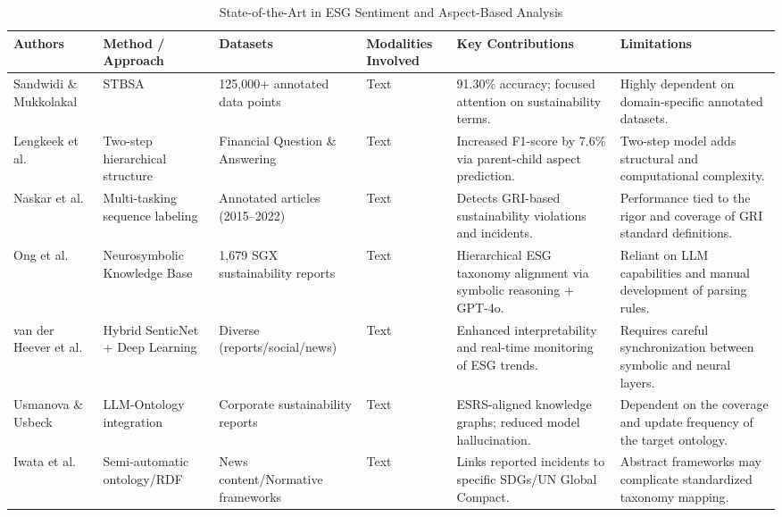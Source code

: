 \begin{landscape}
\begin{table}[p]
\centering
\caption{State-of-the-Art in ESG Sentiment and Aspect-Based Analysis}
\label{tab:esg-sentiment-aspect-analysis}
\small
\renewcommand{\arraystretch}{1.2}
\begin{tabularx}{\linewidth}{|p{1.8cm}|p{3cm}|p{3cm}|p{1.8cm}|X|X|}
\hline
Authors & Method / Approach & Datasets & Modalities Involved & Key Contributions & Limitations \\ \hline
Sandwidi \& Mukkolakal  \parencite{blaise_sandwidi_c58b16e0} & STBSA & 125,000+ annotated data points & Text & 91.30\% accuracy; focused attention on sustainability terms. & Highly dependent on domain-specific annotated datasets. \\ \hline
Lengkeek et al.  \parencite{matteo_lengkeek_5d9f2a4e} & Two-step hierarchical structure & Financial Question \& Answering & Text & Increased F1-score by 7.6\% via parent-child aspect prediction. & Two-step model adds structural and computational complexity. \\ \hline
Naskar et al.  \parencite{abir_naskar_17efeb7b} & Multi-tasking sequence labeling & Annotated articles (2015–2022) & Text & Detects GRI-based sustainability violations and incidents. & Performance tied to the rigor and coverage of GRI standard definitions. \\ \hline
Ong et al.  \parencite{keane_ong_8fec4760} & Neurosymbolic Knowledge Base & 1,679 SGX sustainability reports & Text & Hierarchical ESG taxonomy alignment via symbolic reasoning + GPT-4o. & Reliant on LLM capabilities and manual development of parsing rules. \\ \hline
van der Heever et al.  \parencite{wihan_van_der_heever_5ff35709} & Hybrid SenticNet + Deep Learning & Diverse (reports/social/news) & Text & Enhanced interpretability and real-time monitoring of ESG trends. & Requires careful synchronization between symbolic and neural layers. \\ \hline
Usmanova \& Usbeck  \parencite{aida_usmanova_e9b44e1d} & LLM-Ontology integration & Corporate sustainability reports & Text & ESRS-aligned knowledge graphs; reduced model hallucination. & Dependent on the coverage and update frequency of the target ontology. \\ \hline
Iwata et al.  \parencite{tsuyoshi_iwata_18ccc0b8} & Semi-automatic ontology/RDF & News content/Normative frameworks & Text & Links reported incidents to specific SDGs/UN Global Compact. & Abstract frameworks may complicate standardized taxonomy mapping. \\ \hline

\end{tabularx}
\end{table}
\end{landscape}
